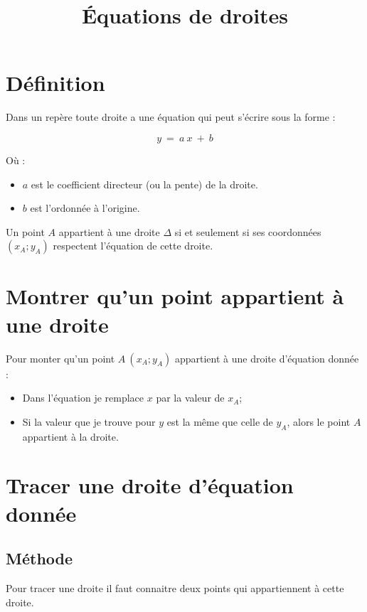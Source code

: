 \documentclass[12pt,a4paper]{article}
\title{\'Equations de droites}
\date{}
\begin{document}
	
\maketitle

\section{Définition}


	Dans un repère toute droite a une équation qui peut s'écrire sous la forme :
	
	\begin{equation*}
		y \: = \: a \: x \: + \: b
	\end{equation*}
	
	Où :
	
	\begin{itemize}
		\item $a$ est le coefficient directeur (ou la pente) de la droite.
		
		\item $b$ est l'ordonnée à l'origine.
	\end{itemize}


	Un point $A$ appartient à une droite $\Delta$ si et seulement si ses coordonnées $(x_A;  y_A)$ respectent l'équation de cette droite.
\section{Montrer qu'un point appartient à une droite}

Pour monter qu'un point $A\:(x_A;  y_A)$ appartient à une droite d'équation donnée :
\begin{itemize}
	\item Dans l'équation je remplace $x$ par la valeur de $x_A$;
	\item Si la valeur que je trouve pour $y$ est la même que celle de $y_A$, alors le point $A$ appartient à la droite.
\end{itemize}

\section{Tracer une droite d'équation donnée}

\subsection{Méthode}
Pour tracer une droite il faut connaitre deux points qui appartiennent à cette droite. 
\end{document}
